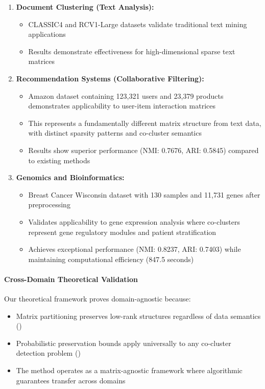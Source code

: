 \documentclass{ar2rc}
\theoremstyle{definition}
\theoremstyle{remark} %
\begin{document}
\begin{enumerate}
  \item \textbf{Document Clustering (Text Analysis):}
        \begin{itemize}
          \item CLASSIC4 and RCV1-Large datasets validate traditional text mining applications
          \item Results demonstrate effectiveness for high-dimensional sparse text matrices
        \end{itemize}

  \item \textbf{Recommendation Systems (Collaborative Filtering):}
        \begin{itemize}
          \item Amazon dataset containing 123,321 users and 23,379 products demonstrates applicability to user-item interaction matrices
          \item This represents a fundamentally different matrix structure from text data, with distinct sparsity patterns and co-cluster semantics
          \item Results show superior performance (NMI: 0.7676, ARI: 0.5845) compared to existing methods
        \end{itemize}

  \item \textbf{Genomics and Bioinformatics:}
        \begin{itemize}
          \item Breast Cancer Wisconsin dataset with 130 samples and 11,731 genes after preprocessing
          \item Validates applicability to gene expression analysis where co-clusters represent gene regulatory modules and patient stratification
          \item Achieves exceptional performance (NMI: 0.8237, ARI: 0.7403) while maintaining computational efficiency (847.5 seconds)
        \end{itemize}
\end{enumerate}

\paragraph{Cross-Domain Theoretical Validation}

Our theoretical framework proves domain-agnostic because:
\begin{itemize}
  \item Matrix partitioning preserves low-rank structures regardless of data semantics ()
  \item Probabilistic preservation bounds apply universally to any co-cluster detection problem ()
  \item The method operates as a matrix-agnostic framework where algorithmic guarantees transfer across domains
\end{itemize}
\end{document}
